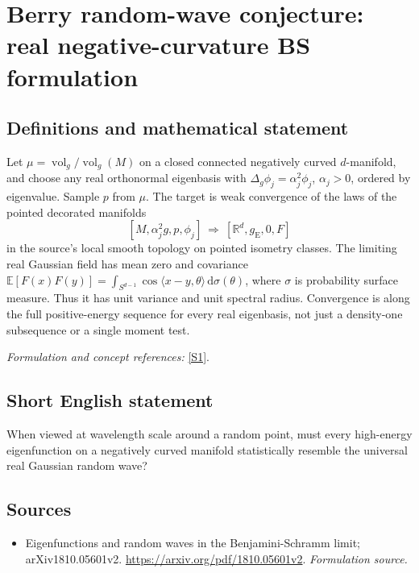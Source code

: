 \documentclass[11pt]{article}
\begin{document}
\section*{\texorpdfstring{Berry random-wave conjecture: real negative-curvature BS formulation}{Berry random-wave conjecture: real negative-curvature BS formulation}}\label{statement}
\subsection{Definitions and mathematical statement}
Let $\mu=\operatorname{vol}_g/\operatorname{vol}_g(M)$ on a closed connected negatively curved $d$-manifold, and choose any real orthonormal eigenbasis with
$\Delta_g\phi_j=\alpha_j^2\phi_j$, $\alpha_j>0$, ordered by eigenvalue. Sample $p$ from $\mu$. The target is weak convergence of the laws of the pointed decorated manifolds
\[
 [M,\alpha_j^2g,p,\phi_j]\ \Longrightarrow\ [{\mathbb{R}}^d,g_{\mathrm E},0,F]
\]
in the source's local smooth topology on pointed isometry classes. The limiting real Gaussian field has mean zero and covariance
${\mathbb{E}}[F(x)F(y)]=\int_{S^{d-1}}\cos\langle x-y,\theta\rangle{\,\mathrm{d}}\sigma(\theta)$,
where $\sigma$ is probability surface measure. Thus it has unit variance and unit spectral radius. Convergence is along the full positive-energy sequence for every real eigenbasis, not just a density-one subsequence or a single moment test.
\par\smallskip\textit{Formulation and concept references:} \href{https://arxiv.org/pdf/1810.05601v2}{[S1]}.

\subsection{Short English statement}
When viewed at wavelength scale around a random point, must every high-energy eigenfunction on a negatively curved manifold statistically resemble the universal real Gaussian random wave?
\subsection{Sources}
\begin{itemize}
\item[S1]Eigenfunctions and random waves in the Benjamini-Schramm limit; arXiv1810.05601v2.
\url{https://arxiv.org/pdf/1810.05601v2}.
\textit{Formulation source.}
\end{itemize}
\end{document}
